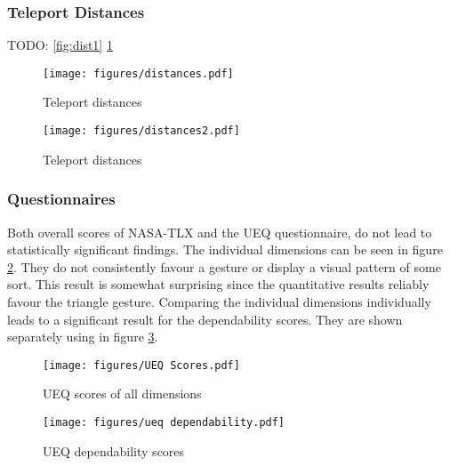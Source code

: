 \subsubsection{Teleport Distances}
TODO: \ref{fig:dist1} \ref{fig:dist2}

\begin{figure}[!htb]
        \texttt{[image: figures/distances.pdf]}
        \caption{Teleport distances}
        \label{fig:dist1}
    \endminipage\hfill
        \texttt{[image: figures/distances2.pdf]}
        \caption{Teleport distances}
        \label{fig:dist2}
    \endminipage\hfill
\end{figure}



\subsubsection{Questionnaires}
Both overall scores of NASA-TLX and the UEQ questionnaire, do not lead to statistically significant findings. The individual dimensions can be seen in figure \ref{fig:ueqDimensions}. They do not consistently favour a gesture or display a visual pattern of some sort. This result is somewhat surprising since the quantitative results reliably favour the triangle gesture. Comparing the individual dimensions individually leads to a significant result for the dependability scores. They are shown separately using  in figure \ref{fig:ueqDependability}. 

\begin{figure}[!ht]
    \centering
    \texttt{[image: figures/UEQ Scores.pdf]}
    \caption{UEQ scores of all dimensions}
    \label{fig:ueqDimensions}
\end{figure}

\begin{figure}[!ht]
    \centering
    \texttt{[image: figures/ueq dependability.pdf]}
    \caption{UEQ dependability scores}
    \label{fig:ueqDependability}
\end{figure}

